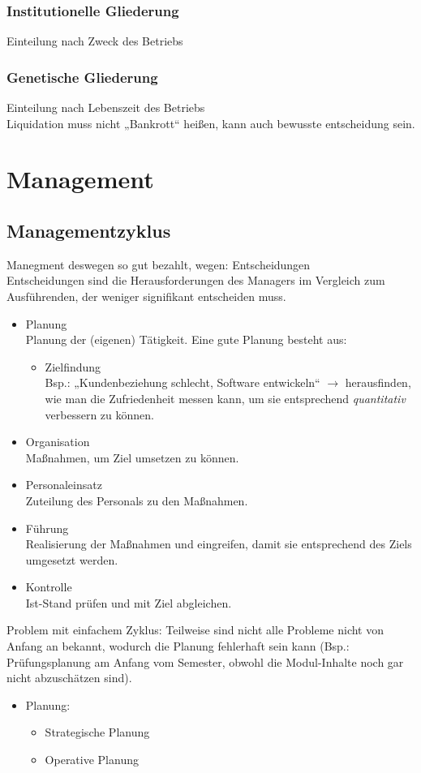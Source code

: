 \subsection{Institutionelle Gliederung}
Einteilung nach Zweck des Betriebs

\subsection{Genetische Gliederung}
Einteilung nach Lebenszeit des Betriebs\\
Liquidation muss nicht „Bankrott“ heißen, kann auch bewusste entscheidung sein.

\chapter{Management}
\section{Managementzyklus}
Manegment deswegen so gut bezahlt, wegen: Entscheidungen\\
Entscheidungen sind die Herausforderungen des Managers im Vergleich zum Ausführenden, der weniger signifikant entscheiden muss.
\begin{itemize}
\item Planung\\
Planung der (eigenen) Tätigkeit. Eine gute Planung besteht aus:
\begin{itemize}
\item Zielfindung\\
Bsp.: „Kundenbeziehung schlecht, Software entwickeln“ $\rightarrow$ herausfinden, wie man die Zufriedenheit messen kann, um sie entsprechend \emph{quantitativ} verbessern zu können.
\end{itemize}
\item Organisation\\
Maßnahmen, um Ziel umsetzen zu können.
\item Personaleinsatz\\
Zuteilung des Personals zu den Maßnahmen.
\item Führung\\
Realisierung der Maßnahmen und eingreifen, damit sie entsprechend des Ziels umgesetzt werden.
\item Kontrolle\\
Ist-Stand prüfen und mit Ziel abgleichen.
\end{itemize}
Problem mit einfachem Zyklus: Teilweise sind nicht alle Probleme nicht von Anfang an bekannt, wodurch die Planung fehlerhaft sein kann (Bsp.: Prüfungsplanung am Anfang vom Semester, obwohl die Modul-Inhalte noch gar nicht abzuschätzen sind).
\begin{itemize}
\item Planung:
\begin{itemize}
\item Strategische Planung
\item Operative Planung
\end{itemize}
\end{itemize}

